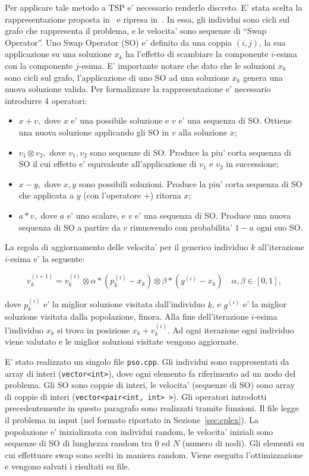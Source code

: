 \documentclass[
12pt, %
a4paper, %
oneside, %
headinclude,footinclude, %
BCOR5mm, %
]{scrartcl}
\begin{document}
Per applicare tale metodo a TSP e' necessario renderlo discreto. E' stata scelta la rappresentazione proposta in~\cite{1259748} e ripresa in~\cite{shi2007particle}. In essa, gli individui sono cicli sul grafo che rappresenta il problema, e le velocita' sono sequenze di ``Swap Operator''. Uno Swap Operator (SO) e' definito da una coppia $(i, j)$, la sua applicazione su una soluzione $x_k$ ha l'effetto di scambiare la componente $i$-esima con la componente $j$-esima. E' importante notare che dato che le soluzioni $x_k$ sono cicli sul grafo, l'applicazione di uno SO ad una soluzione $x_k$ genera una nuova soluzione valida. Per formalizzare la rappresentazione  e' necessario introdurre 4 operatori:
\begin{itemize}
\item $x + v,$ dove $x$ e' una possibile soluzione e $v$ e' una sequenza di SO. Ottiene una nuova soluzione applicando gli SO in $v$ alla soluzione $x$;
\item $v_1 \otimes v_2,$ dove $v_1, v_2$ sono sequenze di SO. Produce la piu' corta sequenza di SO il cui effetto e' equivalente all'applicazione di $v_1$ e $v_2$ in successione;
\item $x-y,$ dove $x, y$ sono possibili soluzioni. Produce la piu' corta sequenza di SO che applicata a $y$ (con l'operatore $+$) ritorna $x$;
\item $a * v,$ dove $a$ e' uno scalare, e $v$ e' una sequenza di SO. Produce una nuova sequenza di SO a partire da $v$ rimuovendo con probabilita' $1-a$ ogni suo SO.
\end{itemize}
La regola di aggiornamento delle velocita' per il generico individuo $k$ all'iterazione $i$-esima e' la seguente:

\[ v^{(i+1)}_k = v_k^{(i)} \otimes \alpha \ast (p_k^{(i)} - x_k) \otimes \beta \ast (g^{(i)} - x_k) \quad \alpha, \beta \in [0, 1], \]

dove $p_k^{(i)}$ e' la miglior soluzione visitata dall'individuo $k$, e $g^{(i)}$ e' la miglior soluzione visitata dalla popolazione, finora. Alla fine dell'iterazione $i$-esima l'individuo $x_k$ si trova in posizione $x_k + v_k^{(i)}$. Ad ogni iterazione ogni individuo viene valutato e le miglior soluzioni visitate vengono aggiornate.

E' stato realizzato un singolo file \texttt{pso.cpp}. Gli individui sono rappresentati da array di interi (\texttt{vector<int>}), dove ogni elemento fa riferimento ad un nodo del problema. Gli SO sono coppie di interi, le velocita' (sequenze di SO) sono array di coppie di interi (\texttt{vector<pair<int, int> >}). Gli operatori introdotti precedentemente in questo paragrafo sono realizzati tramite funzioni. Il file legge il problema in input (nel formato riportato in Sezione~\ref{sec:cplex}). La popolazione e' inizializzata con individui random, le velocita' iniziali sono sequenze di SO di lunghezza random tra 0 ed $N$ (numero di nodi). Gli elementi su cui effettuare swap sono scelti in maniera random. Viene eseguita l'ottimizzazione e vengono salvati i risultati su file.
\end{document}
